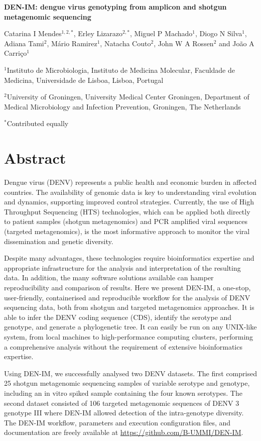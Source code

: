 \cleardoublepage 

\begin{center}
\large
\textbf{DEN-IM: dengue virus genotyping from amplicon and shotgun metagenomic sequencing}
\end{center}

Catarina I Mendes$^{1,2,*}$, 
Erley Lizarazo$^{2,*}$,
Miguel P Machado$^1$, 
Diogo N Silva$^1$,
Adiana Tami$^2$,
Mário Ramirez$^1$, 
Natacha Couto$^2$, 
John W A Rossen$^2$ and João A Carriço$^1$


$^1$Instituto de Microbiologia, Instituto de Medicina Molecular, Faculdade de Medicina, Universidade de Lisboa, Lisboa, Portugal 

$^2$University of Groningen, University Medical Center Groningen, Department of Medical Microbiology and Infection Prevention, Groningen, The Netherlands

$^*$Contributed equally

\section{Abstract}

Dengue virus (DENV) represents a public health and economic burden in affected countries. The availability of genomic data is key to understanding viral evolution and dynamics, supporting improved control strategies. Currently, the use of High Throughput Sequencing (HTS) technologies, which can be applied both directly to patient samples (shotgun metagenomics) and PCR amplified viral sequences (targeted metagenomics), is the most informative approach to monitor the viral dissemination and genetic diversity.

Despite many advantages, these technologies require bioinformatics expertise and appropriate infrastructure for the analysis and interpretation of the resulting data. In addition, the many software solutions available can hamper reproducibility and comparison of results.
Here we present DEN-IM, a one-stop, user-friendly, containerised and reproducible workflow for the analysis of DENV sequencing data, both from shotgun and targeted metagenomics approaches. It is able to infer the DENV coding sequence (CDS), identify the serotype and genotype, and generate a phylogenetic tree. It can easily be run on any UNIX-like system, from local machines to high-performance computing clusters, performing a comprehensive analysis without the requirement of extensive bioinformatics expertise.

Using DEN-IM, we successfully analysed two DENV datasets. The first comprised 25 shotgun metagenomic sequencing samples of variable serotype and genotype, including an in vitro spiked sample containing the four known serotypes. The second dataset consisted of 106 targeted metagenomic sequences of DENV 3 genotype III where DEN-IM allowed detection of the intra-genotype diversity.
The DEN-IM workflow, parameters and execution configuration files, and documentation are freely available at \url{https://github.com/B-UMMI/DEN-IM}.

